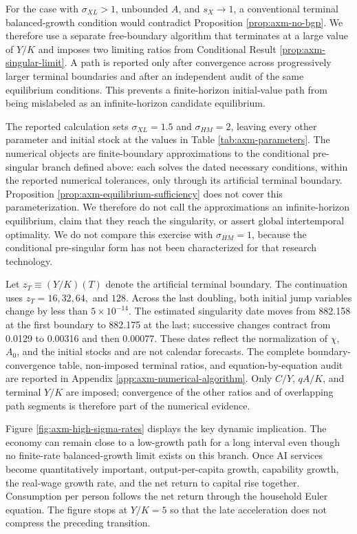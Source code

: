 For the case with \(\sigma_{XL}>1\), unbounded \(A\), and \(s_X\to1\), a
conventional terminal balanced-growth condition would contradict Proposition
\ref{prop:axm-no-bgp}. We therefore use a separate
free-boundary algorithm that terminates at a large value of \(Y/K\) and imposes
two limiting ratios from Conditional Result \ref{prop:axm-singular-limit}. A path is
reported only after convergence across progressively larger terminal boundaries
and after an independent audit of the same equilibrium conditions. This prevents a
finite-horizon initial-value path from being mislabeled as an infinite-horizon
candidate equilibrium.

The reported calculation sets \(\sigma_{XL}=1.5\) and
\(\sigma_{HM}=2\), leaving every other parameter and initial stock at the values
in Table \ref{tab:axm-parameters}. The numerical objects are finite-boundary
approximations to the conditional pre-singular branch defined above: each solves
the dated necessary conditions, within the reported numerical tolerances, only
through its artificial terminal boundary.
Proposition \ref{prop:axm-equilibrium-sufficiency} does not cover this
parameterization. We therefore do not call the approximations an infinite-horizon
equilibrium, claim that they reach the singularity, or assert global
intertemporal optimality.
We do not compare this exercise with \(\sigma_{HM}=1\), because the conditional
pre-singular form has not been characterized for that research technology.

Let \(z_T\equiv(Y/K)(T)\) denote the artificial terminal boundary. The
continuation uses \(z_T=16,32,64,\) and \(128\).
Across the last doubling, both initial jump variables change by less than
\(5\times10^{-14}\). The estimated singularity date moves from 882.158 at the
first boundary to 882.175 at the last; successive changes contract from 0.0129
to 0.00316 and then 0.00077. These dates reflect the normalization of
\(\chi\), \(A_0\), and the initial stocks and are not calendar forecasts.
The complete boundary-convergence table, non-imposed terminal ratios, and
equation-by-equation audit are reported in Appendix
\ref{app:axm-numerical-algorithm}. Only \(C/Y\), \(qA/K\), and terminal \(Y/K\) are
imposed; convergence of the other ratios and of overlapping path segments is
therefore part of the numerical evidence.

Figure \ref{fig:axm-high-sigma-rates} displays the key dynamic implication. The
economy can remain close to a low-growth path for a long interval even though no
finite-rate balanced-growth limit exists on this branch. Once AI services become
quantitatively important, output-per-capita growth, capability growth,
the real-wage growth rate, and the net return to capital rise together. Consumption
per person follows the net return through the household Euler equation. The
figure stops at \(Y/K=5\) so
that the late acceleration does not compress the preceding transition.

